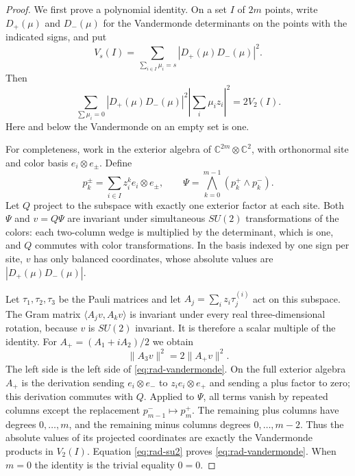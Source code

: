 \begin{proof}
We first prove a polynomial identity.  On a set $I$ of $2m$ points,
write $D_+(\mu)$ and $D_-(\mu)$ for the Vandermonde determinants on
the points with the indicated signs, and put
\[
 V_s(I)=\sum_{\sum_{i\in I}\mu_i=s}|D_+(\mu)D_-(\mu)|^2.
\]
Then
\begin{equation}
 \sum_{\sum\mu_i=0}|D_+(\mu)D_-(\mu)|^2
                  \left|\sum_i\mu_i z_i\right|^2
                         =2V_2(I).
 \label{eq:rad-vandermonde}
\end{equation}
Here and below the Vandermonde on an empty set is one.

For completeness, work in the exterior algebra of
$\mathbb C^{2m}\otimes\mathbb C^2$, with orthonormal site and color
basis $e_i\otimes e_\pm$.  Define
\[
 p_k^\pm=\sum_{i\in I}z_i^k e_i\otimes e_\pm,
 \qquad
 \Psi=\bigwedge_{k=0}^{m-1}(p_k^+\wedge p_k^-).
\]
Let $Q$ project to the subspace with exactly one exterior factor at
each site.  Both $\Psi$ and $v=Q\Psi$ are invariant under simultaneous
$SU(2)$ transformations of the colors: each two-column wedge is
multiplied by the determinant, which is one, and $Q$ commutes with
color transformations.  In the basis indexed by one sign per site,
$v$ has only balanced coordinates, whose absolute values are
$|D_+(\mu)D_-(\mu)|$.

Let $\tau_1,\tau_2,\tau_3$ be the Pauli matrices and let
$A_j=\sum_i z_i\tau_j^{(i)}$ act on this subspace.  The Gram matrix
$\langle A_jv,A_kv\rangle$ is invariant under every real
three-dimensional rotation, because $v$ is $SU(2)$ invariant.
It is therefore a scalar multiple of the identity.  For
$A_+=(A_1+iA_2)/2$ we obtain
\begin{equation}
                  \|A_3v\|^2=2\|A_+v\|^2.
 \label{eq:rad-su2}
\end{equation}
The left side is the left side of \eqref{eq:rad-vandermonde}.
On the full exterior algebra $A_+$ is the derivation sending
$e_i\otimes e_-$ to $z_i e_i\otimes e_+$ and sending a plus factor
to zero; this derivation commutes with $Q$.  Applied to $\Psi$, all
terms vanish by repeated columns except the replacement
$p_{m-1}^-\mapsto p_m^+$.  The remaining plus columns have degrees
$0,\ldots,m$, and the remaining minus columns degrees
$0,\ldots,m-2$.  Thus the absolute values of its projected coordinates
are exactly the Vandermonde products in $V_2(I)$.  Equation
\eqref{eq:rad-su2} proves \eqref{eq:rad-vandermonde}.  When $m=0$ the
identity is the trivial equality $0=0$.


\end{proof}
